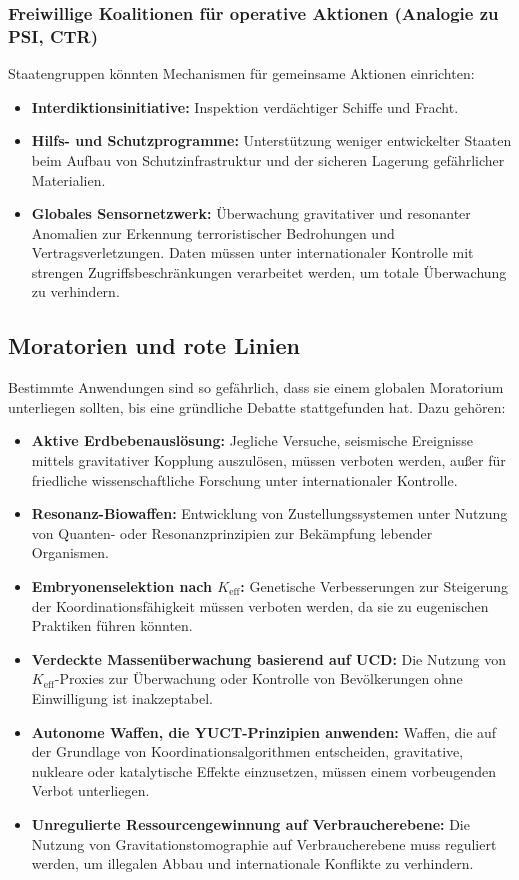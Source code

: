 \documentclass[12pt,a4paper]{article}
\theoremstyle{remark}
\newcommand{\Keff}{K_{\mathrm{eff}}}
\begin{document}
	\subsubsection{Freiwillige Koalitionen für operative Aktionen (Analogie zu PSI, CTR)}
	
	Staatengruppen könnten Mechanismen für gemeinsame Aktionen einrichten:
	\begin{itemize}
		\item \textbf{Interdiktionsinitiative:} Inspektion verdächtiger Schiffe und Fracht.
		\item \textbf{Hilfs- und Schutzprogramme:} Unterstützung weniger entwickelter Staaten beim Aufbau von Schutzinfrastruktur und der sicheren Lagerung gefährlicher Materialien.
		\item \textbf{Globales Sensornetzwerk:} Überwachung gravitativer und resonanter Anomalien zur Erkennung terroristischer Bedrohungen und Vertragsverletzungen. Daten müssen unter internationaler Kontrolle mit strengen Zugriffsbeschränkungen verarbeitet werden, um totale Überwachung zu verhindern.
	\end{itemize}
	
	\subsection{Moratorien und rote Linien}
	\label{subsec:redlines}
	
	Bestimmte Anwendungen sind so gefährlich, dass sie einem globalen Moratorium unterliegen sollten, bis eine gründliche Debatte stattgefunden hat. Dazu gehören:
	\begin{itemize}[leftmargin=*]
		\item \textbf{Aktive Erdbebenauslösung:} Jegliche Versuche, seismische Ereignisse mittels gravitativer Kopplung auszulösen, müssen verboten werden, außer für friedliche wissenschaftliche Forschung unter internationaler Kontrolle.
		\item \textbf{Resonanz-Biowaffen:} Entwicklung von Zustellungssystemen unter Nutzung von Quanten- oder Resonanzprinzipien zur Bekämpfung lebender Organismen.
		\item \textbf{Embryonenselektion nach \(\Keff\):} Genetische Verbesserungen zur Steigerung der Koordinationsfähigkeit müssen verboten werden, da sie zu eugenischen Praktiken führen könnten.
		\item \textbf{Verdeckte Massenüberwachung basierend auf UCD:} Die Nutzung von \(\Keff\)-Proxies zur Überwachung oder Kontrolle von Bevölkerungen ohne Einwilligung ist inakzeptabel.
		\item \textbf{Autonome Waffen, die YUCT-Prinzipien anwenden:} Waffen, die auf der Grundlage von Koordinationsalgorithmen entscheiden, gravitative, nukleare oder katalytische Effekte einzusetzen, müssen einem vorbeugenden Verbot unterliegen.
		\item \textbf{Unregulierte Ressourcengewinnung auf Verbraucherebene:} Die Nutzung von Gravitationstomographie auf Verbraucherebene muss reguliert werden, um illegalen Abbau und internationale Konflikte zu verhindern.
	\end{itemize}
	
\end{document}
